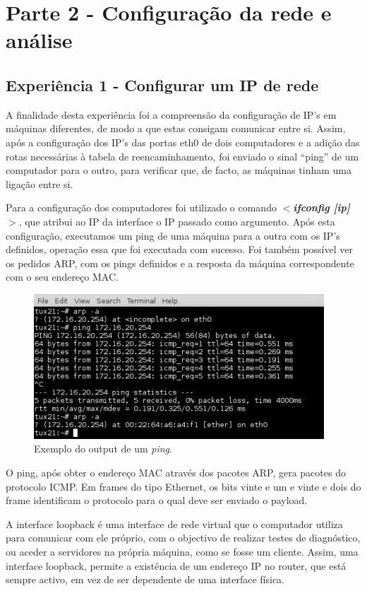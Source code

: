 \documentclass[a4paper]{article}
\begin{document}
\section{Parte 2 - Configuração da rede e análise}
\subsection{Experiência 1 - Configurar um IP de rede}
A finalidade desta experiência foi a compreensão da configuração de IP’s em máquinas diferentes, de modo a que estas consigam comunicar entre si. Assim, após a configuração dos IP’s das portas eth0 de dois computadores e a adição das rotas necessárias à tabela de reencaminhamento, foi enviado o sinal “ping” de um computador para o outro, para verificar que, de facto, as máquinas tinham uma ligação entre si.

Para a configuração dos computadores foi utilizado o comando \textbf{\textit{$<$ifconfig [ip]$>$}}, que atribui ao IP da interface o IP passado como argumento. Após esta configuração, executamos um ping de uma máquina para a outra com os IP’s definidos, operação essa que foi executada com sucesso. Foi também possível ver os pedidos ARP, com os pings definidos e a resposta da máquina correspondente com o seu endereço MAC.

\begin{figure}[h!]
\centering
\includegraphics[scale=0.5]{res/image1.jpg}
\caption{Exemplo do output de um \emph{ping}.}
\end{figure}

O ping, após obter o endereço MAC através dos pacotes ARP, gera pacotes do protocolo ICMP. Em frames do tipo Ethernet, os bits vinte e um e vinte e dois do frame identificam o protocolo para o qual deve ser enviado o payload.

\pagebreak

A interface loopback é uma interface de rede virtual que o computador utiliza para comunicar com ele próprio, com o objectivo de realizar testes de diagnóstico, ou aceder a servidores na própria máquina, como se fosse um cliente. Assim, uma interface loopback, permite a existência de um endereço IP no router, que está sempre activo, em vez de ser dependente de uma interface física.
\end{document}

